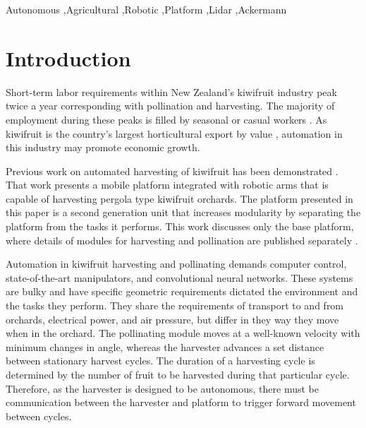 \documentclass[preprint,authoryear,12pt]{elsarticle}
\begin{document}
\begin{frontmatter}
\begin{keyword}

    Autonomous \sep Agricultural \sep Robotic \sep Platform \sep Lidar \sep Ackermann
\end{keyword}

\end{frontmatter}


\section{Introduction}
\label{sect:intro}
    Short-term labor requirements within New Zealand's kiwifruit industry peak twice a year corresponding with pollination and harvesting.
    The majority of employment during these peaks is filled by seasonal or casual workers \citep{Timmins2009}.
    As kiwifruit is the country's largest horticultural export by value \citep{StatisticsNewZealand2015}, automation in this industry may promote economic growth.

    Previous work on automated harvesting of kiwifruit has been demonstrated \citep{Scarfe2012,scarfe2009}.
    That work presents a mobile platform integrated with robotic arms that is capable of harvesting pergola type kiwifruit orchards.
    The platform presented in this paper is a second generation unit that increases modularity by separating the platform from the tasks it performs.
    This work discusses only the base platform, where details of modules for harvesting and pollination are published separately \citep{williams2017,Seabright2017}.

    Automation in kiwifruit harvesting and pollinating demands computer control, state-of-the-art manipulators, and convolutional neural networks.
    These systems are bulky and have specific geometric requirements dictated the environment and the tasks they perform.
    They share the requirements of transport to and from orchards, electrical power, and air pressure, but differ in they way they move when in the orchard.
    The pollinating module moves at a well-known velocity with minimum changes in angle, whereas the harvester advances a set distance between stationary harvest cycles.
    The duration of a harvesting cycle is determined by the number of fruit to be harvested during that particular cycle.
    Therefore, as the harvester is designed to be autonomous, there must be communication between the harvester and platform to trigger forward movement between cycles.
\end{document}
